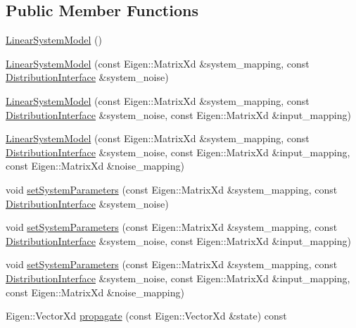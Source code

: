\subsection*{Public Member Functions}
\begin{DoxyCompactItemize}
\item 
\hyperlink{classrefill_1_1LinearSystemModel_a3e65d1c380d1c9abf807ca3a4814043e}{Linear\+System\+Model} ()
\item 
\hyperlink{classrefill_1_1LinearSystemModel_ab153e34ae8b09eedf442841f744851e6}{Linear\+System\+Model} (const Eigen\+::\+Matrix\+Xd \&system\+\_\+mapping, const \hyperlink{classrefill_1_1DistributionInterface}{Distribution\+Interface} \&system\+\_\+noise)
\item 
\hyperlink{classrefill_1_1LinearSystemModel_a48ede1019cfda95201e84371562d376b}{Linear\+System\+Model} (const Eigen\+::\+Matrix\+Xd \&system\+\_\+mapping, const \hyperlink{classrefill_1_1DistributionInterface}{Distribution\+Interface} \&system\+\_\+noise, const Eigen\+::\+Matrix\+Xd \&input\+\_\+mapping)
\item 
\hyperlink{classrefill_1_1LinearSystemModel_a35cfa05a9104d41f924acd5a9b183deb}{Linear\+System\+Model} (const Eigen\+::\+Matrix\+Xd \&system\+\_\+mapping, const \hyperlink{classrefill_1_1DistributionInterface}{Distribution\+Interface} \&system\+\_\+noise, const Eigen\+::\+Matrix\+Xd \&input\+\_\+mapping, const Eigen\+::\+Matrix\+Xd \&noise\+\_\+mapping)
\item 
void \hyperlink{classrefill_1_1LinearSystemModel_aa1644a0a0d363634205eaa7d1e1bfea8}{set\+System\+Parameters} (const Eigen\+::\+Matrix\+Xd \&system\+\_\+mapping, const \hyperlink{classrefill_1_1DistributionInterface}{Distribution\+Interface} \&system\+\_\+noise)
\item 
void \hyperlink{classrefill_1_1LinearSystemModel_a1bfe228bb42920399034c39ff59ae09d}{set\+System\+Parameters} (const Eigen\+::\+Matrix\+Xd \&system\+\_\+mapping, const \hyperlink{classrefill_1_1DistributionInterface}{Distribution\+Interface} \&system\+\_\+noise, const Eigen\+::\+Matrix\+Xd \&input\+\_\+mapping)
\item 
void \hyperlink{classrefill_1_1LinearSystemModel_aae2e0643e8091ccb36c14496a4e86334}{set\+System\+Parameters} (const Eigen\+::\+Matrix\+Xd \&system\+\_\+mapping, const \hyperlink{classrefill_1_1DistributionInterface}{Distribution\+Interface} \&system\+\_\+noise, const Eigen\+::\+Matrix\+Xd \&input\+\_\+mapping, const Eigen\+::\+Matrix\+Xd \&noise\+\_\+mapping)
\item 
Eigen\+::\+Vector\+Xd \hyperlink{classrefill_1_1LinearSystemModel_a6071f788057f7b1a4f382fbefd446369}{propagate} (const Eigen\+::\+Vector\+Xd \&state) const 

\end{DoxyCompactItemize}
